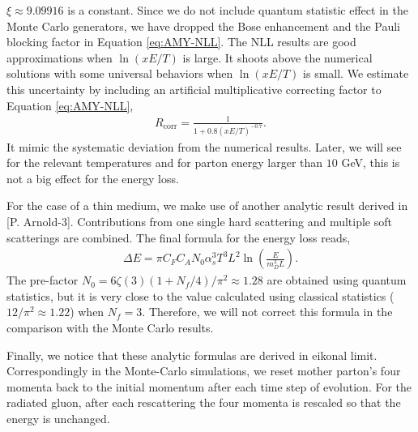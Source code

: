 \documentclass[aps, prc, reprint, amsmath, groupedaddress, nofootinbib]{revtex4-1}
\begin{document}
$\xi\approx9.09916$ is a constant. Since we do not include quantum statistic effect in the Monte Carlo generators, we have dropped the Bose enhancement and the Pauli blocking factor in Equation \ref{eq:AMY-NLL}.
The NLL results are good approximations when $\ln(xE/T)$ is large. 
It shoots above the numerical solutions with some universal behaviors when $\ln(xE/T)$ is small.
We estimate this uncertainty by including an artificial multiplicative correcting factor to Equation \ref{eq:AMY-NLL}, 
\begin{eqnarray}
R_{\textrm{corr}} = \frac{1}{1+0.8\left(xE/T\right)^{-0.7}}.
\end{eqnarray}
It mimic the systematic deviation from the numerical results. 
Later, we will see for the relevant temperatures and for parton energy larger than $10$ GeV, this is not a big effect for the energy loss.

For the case of a thin medium, we make use of another analytic result derived in [P. Arnold-3]. 
Contributions from one single hard scattering and multiple soft scatterings are combined. The final formula for the energy loss reads,
\begin{eqnarray}\label{eq:dE-thin}
\Delta E = \pi C_F C_A N_0 \alpha_s^3 T^3 L^2 \ln\left(\frac{E}{m_D^2 L}\right).
\end{eqnarray}
The pre-factor $N_0 = 6\zeta(3)(1+N_f/4)/\pi^2 \approx 1.28$ 
are obtained using quantum statistics, but it is very close to the value calculated using classical statistics ($12/\pi^2 \approx 1.22$) when $N_f=3$.
Therefore, we will not correct this formula in the comparison with the Monte Carlo results.

Finally, we notice that these analytic formulas are derived in eikonal limit. Correspondingly in the Monte-Carlo simulations, we reset mother parton's four momenta back to the initial momentum after each time step of evolution. For the radiated gluon, after each rescattering the four momenta is rescaled so that the energy is unchanged.
\end{document}
